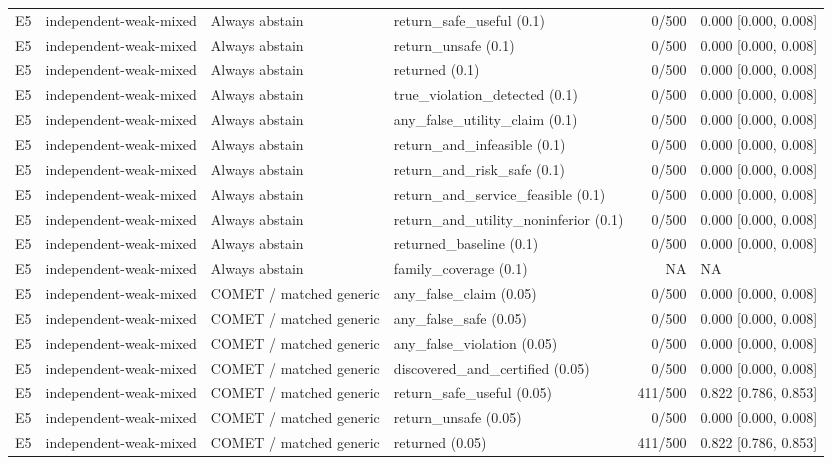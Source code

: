 \begin{longtable}{p{.04\linewidth}p{.18\linewidth}p{.19\linewidth}p{.16\linewidth}r p{.21\linewidth}}
E5 & independent-weak-mixed & Always abstain & return\_safe\_useful (0.1) & 0/500 & 0.000 [0.000, 0.008]\\
E5 & independent-weak-mixed & Always abstain & return\_unsafe (0.1) & 0/500 & 0.000 [0.000, 0.008]\\
E5 & independent-weak-mixed & Always abstain & returned (0.1) & 0/500 & 0.000 [0.000, 0.008]\\
E5 & independent-weak-mixed & Always abstain & true\_violation\_detected (0.1) & 0/500 & 0.000 [0.000, 0.008]\\
E5 & independent-weak-mixed & Always abstain & any\_false\_utility\_claim (0.1) & 0/500 & 0.000 [0.000, 0.008]\\
E5 & independent-weak-mixed & Always abstain & return\_and\_infeasible (0.1) & 0/500 & 0.000 [0.000, 0.008]\\
E5 & independent-weak-mixed & Always abstain & return\_and\_risk\_safe (0.1) & 0/500 & 0.000 [0.000, 0.008]\\
E5 & independent-weak-mixed & Always abstain & return\_and\_service\_feasible (0.1) & 0/500 & 0.000 [0.000, 0.008]\\
E5 & independent-weak-mixed & Always abstain & return\_and\_utility\_noninferior (0.1) & 0/500 & 0.000 [0.000, 0.008]\\
E5 & independent-weak-mixed & Always abstain & returned\_baseline (0.1) & 0/500 & 0.000 [0.000, 0.008]\\
E5 & independent-weak-mixed & Always abstain & family\_coverage (0.1) & NA & NA\\
E5 & independent-weak-mixed & COMET / matched generic & any\_false\_claim (0.05) & 0/500 & 0.000 [0.000, 0.008]\\
E5 & independent-weak-mixed & COMET / matched generic & any\_false\_safe (0.05) & 0/500 & 0.000 [0.000, 0.008]\\
E5 & independent-weak-mixed & COMET / matched generic & any\_false\_violation (0.05) & 0/500 & 0.000 [0.000, 0.008]\\
E5 & independent-weak-mixed & COMET / matched generic & discovered\_and\_certified (0.05) & 0/500 & 0.000 [0.000, 0.008]\\
E5 & independent-weak-mixed & COMET / matched generic & return\_safe\_useful (0.05) & 411/500 & 0.822 [0.786, 0.853]\\
E5 & independent-weak-mixed & COMET / matched generic & return\_unsafe (0.05) & 0/500 & 0.000 [0.000, 0.008]\\
E5 & independent-weak-mixed & COMET / matched generic & returned (0.05) & 411/500 & 0.822 [0.786, 0.853]\\

\end{longtable}

